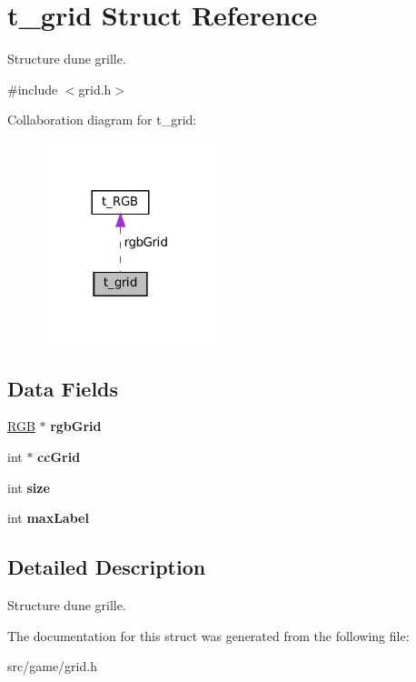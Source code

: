 \hypertarget{structt__grid}{}\section{t\+\_\+grid Struct Reference}
\label{structt__grid}


Structure d\textquotesingle{}une grille.  




{\ttfamily \#include $<$grid.\+h$>$}



Collaboration diagram for t\+\_\+grid\+:
\nopagebreak
\begin{figure}[H]
\begin{center}
\leavevmode
\includegraphics[width=144pt]{structt__grid__coll__graph}
\end{center}
\end{figure}
\subsection*{Data Fields}
\begin{DoxyCompactItemize}
\item 
\mbox{\label{structt__grid_aa6f2a52326d2c1cbac9582f07c863527}} 
\hyperlink{structt___r_g_b}{R\+GB} $\ast$ {\bfseries rgb\+Grid}
\item 
\mbox{\label{structt__grid_ae9a300bb716cd15c538cbf00aa6db8f9}} 
int $\ast$ {\bfseries cc\+Grid}
\item 
\mbox{\label{structt__grid_a439227feff9d7f55384e8780cfc2eb82}} 
int {\bfseries size}
\item 
\mbox{\label{structt__grid_aed485617e262f55fd47a014bdcb6e2a0}} 
int {\bfseries max\+Label}
\end{DoxyCompactItemize}


\subsection{Detailed Description}
Structure d\textquotesingle{}une grille. 

The documentation for this struct was generated from the following file\+:\begin{DoxyCompactItemize}
\item 
src/game/grid.\+h\end{DoxyCompactItemize}
